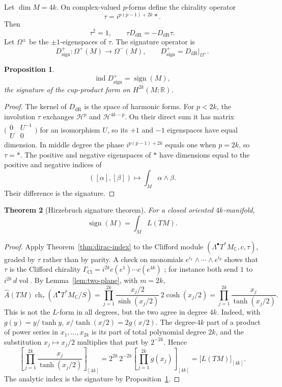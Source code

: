 \documentclass[11pt,oneside,reqno]{book}
\DeclareMathOperator{\ind}{ind}
\DeclareMathOperator{\Cl}{Cl}
\newcommand{\R}{\mathbb R}
\newcommand{\C}{\mathbb C}
\newcommand{\Ahat}{\widehat A}
\theoremstyle{plain}
\newtheorem{theorem}{Theorem}[chapter]
\newtheorem{proposition}[theorem]{Proposition}
\theoremstyle{definition}
\theoremstyle{remark}
\begin{document}
Let \(\dim M=4k\). On complex-valued \(p\)-forms define the chirality
operator
\[
 \tau=i^{p(p-1)+2k}*.
\]
Then
\[
 \tau^2=1,\qquad
 \tau D_{\mathrm{dR}}=-D_{\mathrm{dR}}\tau.
\]
Let \(\Omega^\pm\) be the \(\pm1\)-eigenspaces of \(\tau\). The signature
operator is
\[
 D_{\mathrm{sign}}^+:
 \Omega^+(M)\longrightarrow\Omega^-(M),
 \qquad
 D_{\mathrm{sign}}^+=D_{\mathrm{dR}}|_{\Omega^+}.
\]

\begin{proposition}\label{prop:signature-index}
\[
 \ind D_{\mathrm{sign}}^+=\operatorname{sign}(M),
\]
the signature of the cup-product form on \(H^{2k}(M;\R)\).
\end{proposition}

\begin{proof}
The kernel of \(D_{\mathrm{dR}}\) is the space of harmonic forms. For
\(p<2k\), the involution \(\tau\) exchanges
\(\mathcal H^p\) and \(\mathcal H^{4k-p}\). On their direct sum it has
matrix \(\bigl(\begin{smallmatrix}0&U^{-1}\\ U&0\end{smallmatrix}\bigr)\)
for an isomorphism \(U\), so its \(+1\) and \(-1\) eigenspaces have equal
dimension. In middle degree the phase \(i^{p(p-1)+2k}\) equals one when
\(p=2k\), so \(\tau=*\).
The positive and negative eigenspaces of \(*\) have dimensions equal to
the positive and negative indices of
\[
 ([\alpha],[\beta])\longmapsto\int_M\alpha\wedge\beta.
\]
Their difference is the signature.
\end{proof}

\begin{theorem}[Hirzebruch signature theorem]
For a closed oriented \(4k\)-manifold,
\[
 \boxed{
 \operatorname{sign}(M)
 =
 \int_M L(TM).
 }
\]
\end{theorem}

\begin{proof}
Apply Theorem~\ref{thm:dirac-index} to the Clifford module
\((\Lambda^\bullet T^*M_\mathbb C,c,\tau)\), graded by \(\tau\) rather than
by parity.  A check on monomials \(e^{i_1}\wedge\cdots\wedge e^{i_p}\)
shows that \(\tau\) is the Clifford chirality
\(\Gamma_{\Cl}=i^{2k}c(e^1)\cdots c(e^{4k})\) \cite[Chapter~3]{BGV}; for
instance both send \(1\) to \(i^{2k}\,d\operatorname{vol}\).  By
Lemma~\ref{lem:two-plane}, with \(m=2k\),
\[
 \Ahat(TM)\operatorname{ch}_{\tau}(\Lambda^\bullet T^*M_\C/S)
 =\prod_{j=1}^{2k}\frac{x_j/2}{\sinh(x_j/2)}\,2\cosh(x_j/2)
 =\prod_{j=1}^{2k}\frac{x_j}{\tanh(x_j/2)}.
\]
This is not the \(L\)-form in all degrees, but the two agree in degree
\(4k\).  Indeed, with \(g(y)=y/\tanh y\),
\(x/\tanh(x/2)=2g(x/2)\).  The degree-\(4k\) part of a product of power
series in \(x_1,\ldots,x_{2k}\) is its part of total polynomial degree
\(2k\), and the substitution \(x_j\mapsto x_j/2\) multiplies that part by
\(2^{-2k}\).  Hence
\begin{equation}\label{eq:signature-character}
 \left[\prod_{j=1}^{2k}\frac{x_j}{\tanh(x_j/2)}\right]_{[4k]}
 =2^{2k}\,2^{-2k}\left[\prod_{j=1}^{2k}g(x_j)\right]_{[4k]}
 =\bigl[L(TM)\bigr]_{[4k]}.
\end{equation}
The analytic index is the signature by
Proposition~\ref{prop:signature-index}.
\end{proof}
\end{document}
